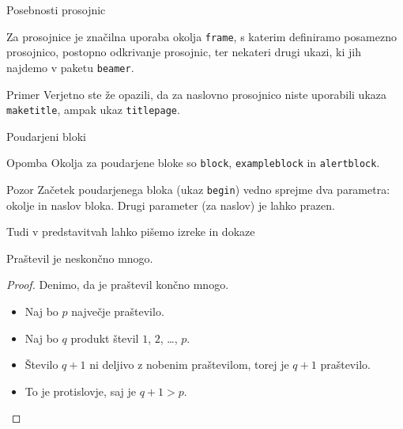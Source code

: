 \begin{frame}{Posebnosti prosojnic}

	Za prosojnice je značilna uporaba okolja \texttt{frame},
	s katerim definiramo posamezno prosojnico, \pause
	postopno odkrivanje prosojnic, \pause
	ter nekateri drugi ukazi, ki jih najdemo v paketu \texttt{beamer}. \pause
	\begin{exampleblock}{Primer}
		Verjetno ste že opazili, da za naslovno prosojnico niste uporabili
		ukaza \texttt{maketitle}, ampak ukaz \texttt{titlepage}.
	\end{exampleblock}
\end{frame}

\begin{frame}{Poudarjeni bloki}

\begin{block}{Opomba}
	Okolja za poudarjene bloke so \texttt{block}, \texttt{exampleblock} in \texttt{alertblock}.
\end{block}
		
\begin{alertblock}{Pozor}
	Začetek poudarjenega bloka (ukaz \texttt{begin}) vedno sprejme 
	dva parametra: okolje in naslov bloka.
	Drugi parameter (za naslov) je lahko prazen. 
\end{alertblock}


\end{frame}

\begin{frame}{Tudi v predstavitvah lahko pišemo izreke in dokaze}

	\begin{izrek}
	   Praštevil je neskončno mnogo.
	\end{izrek}
	\begin{proof}
	   Denimo, da je praštevil končno mnogo.
	   \begin{itemize}[<+->]
		  \item Naj bo $p$ \alert<4>{največje} praštevilo. 
		  \item Naj bo $q$ produkt števil $1$, $2$, \ldots, $p$. 
		  \item Število $q+1$ ni deljivo z nobenim praštevilom, torej je $q+1$ praštevilo. 
		  \item To je protislovje, saj je $q+1>p$. \qedhere 
	   \end{itemize}
	\end{proof}
 \end{frame}
 